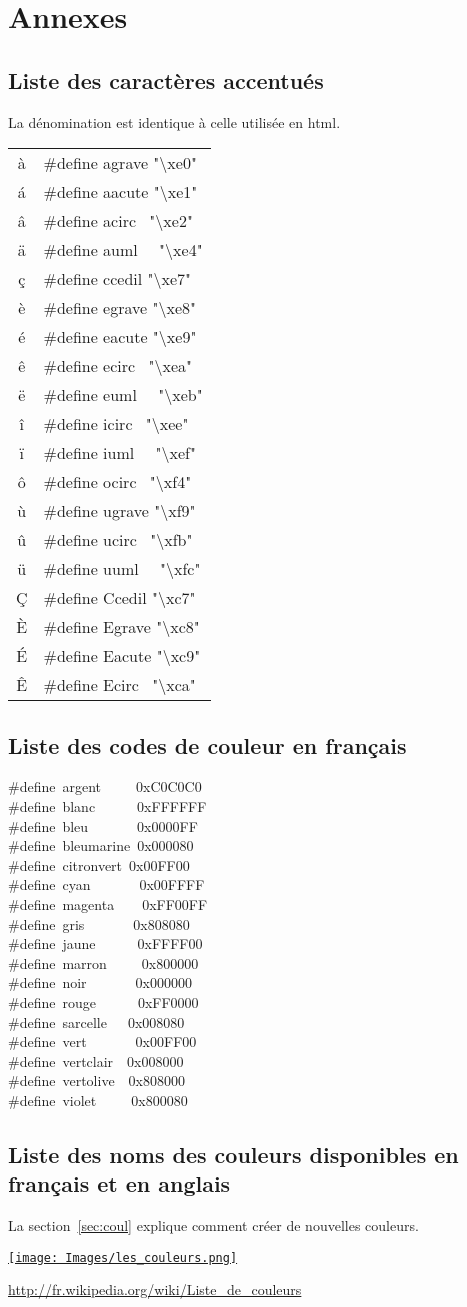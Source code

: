 \documentclass{report}
\newcommand\code[1]{
\begin{mdframed}[linecolor=purple,backgroundcolor=blue!10]
{\tt
#1
}
\end{mdframed}
}
\begin{document}
\newcommand\letac[2]{\#define #1 "\textbackslash #2"\\}
\newcommand\letacfin[2]{\#define #1 "\textbackslash #2"}

\appendix
\chapter{Annexes}
\section{Liste des caractères accentués}
La dénomination est identique à celle utilisée en html.
\code{
\begin{tabular}{|c|l|}
\hline
à   & \letac{agrave}{xe0}
\'a & \letac{aacute}{xe1}
â   & \letac{acirc~}{xe2}
ä   & \letac{auml~~}{xe4}
ç   & \letac{ccedil}{xe7}
è   & \letac{egrave}{xe8}
é   & \letac{eacute}{xe9}
ê   & \letac{ecirc~}{xea}
ë   & \letac{euml~~}{xeb}
î   & \letac{icirc~}{xee}
ï   & \letac{iuml~~}{xef}
ô   & \letac{ocirc~}{xf4}
ù   & \letac{ugrave}{xf9}
û   & \letac{ucirc~}{xfb}
ü   & \letac{uuml~~}{xfc}
\c{C} & \letac{Ccedil}{xc7}
È   & \letac{Egrave}{xc8}
\'E & \letac{Eacute}{xc9}
Ê   & \letac{Ecirc~}{xca}
\hline
\end{tabular}
}

\section{Liste des codes de couleur en français}
\code{
\#define~argent~~~~~0xC0C0C0\\
\#define~blanc~~~~~~0xFFFFFF\\
\#define~bleu~~~~~~~0x0000FF\\
\#define~bleumarine~0x000080\\
\#define~citronvert~0x00FF00\\
\#define~cyan~~~~~~~0x00FFFF\\
\#define~magenta~~~~0xFF00FF\\
\#define~gris~~~~~~~0x808080\\
\#define~jaune~~~~~~0xFFFF00\\
\#define~marron~~~~~0x800000\\
\#define~noir~~~~~~~0x000000\\
\#define~rouge~~~~~~0xFF0000\\
\#define~sarcelle~~~0x008080\\
\#define~vert~~~~~~~0x00FF00\\
\#define~vertclair~~0x008000\\
\#define~vertolive~~0x808000\\
\#define~violet~~~~~0x800080
}

\section{Liste des noms des couleurs disponibles en français et en anglais}
La section~\ref{sec:coul} explique comment créer de nouvelles couleurs.

\centerline{\href{http://fr.wikipedia.org/wiki/Liste_de_couleurs}
{\texttt{[image: Images/les\_couleurs.png]}}}

\centerline{\url{http://fr.wikipedia.org/wiki/Liste_de_couleurs}}
\end{document}
